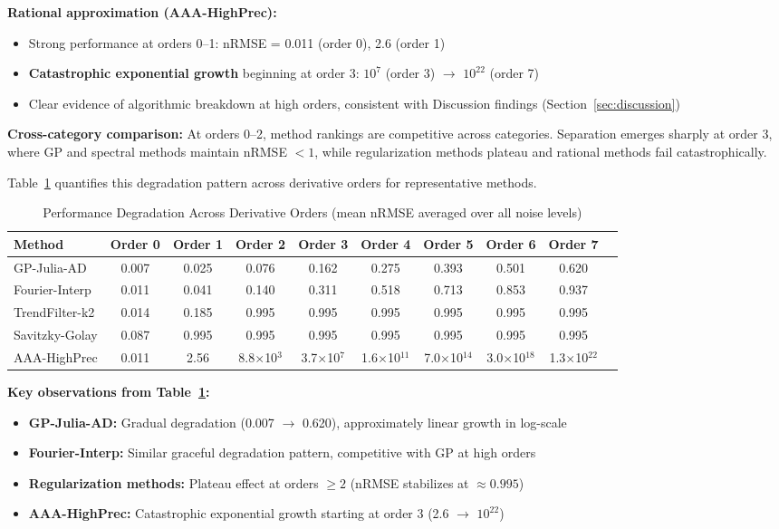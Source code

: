 \textbf{Rational approximation (AAA-HighPrec):}
\begin{itemize}
    \item Strong performance at orders 0--1: nRMSE = 0.011 (order 0), 2.6 (order 1)
    \item \textbf{Catastrophic exponential growth} beginning at order 3: $10^7$ (order 3) $\to$ $10^{22}$ (order 7)
    \item Clear evidence of algorithmic breakdown at high orders, consistent with Discussion findings (Section~\ref{sec:discussion})
\end{itemize}

\textbf{Cross-category comparison:} At orders 0--2, method rankings are competitive across categories. Separation emerges sharply at order 3, where GP and spectral methods maintain nRMSE $< 1$, while regularization methods plateau and rational methods fail catastrophically.

Table~\ref{tab:performance_by_order} quantifies this degradation pattern across derivative orders for representative methods.

\begin{table}[htbp]
\centering
\caption{Performance Degradation Across Derivative Orders (mean nRMSE averaged over all noise levels)}
\label{tab:performance_by_order}
\small
\begin{tabular}{lccccccccc}
\toprule
\textbf{Method} & \textbf{Order 0} & \textbf{Order 1} & \textbf{Order 2} & \textbf{Order 3} & \textbf{Order 4} & \textbf{Order 5} & \textbf{Order 6} & \textbf{Order 7} \\
\midrule
GP-Julia-AD & 0.007 & 0.025 & 0.076 & 0.162 & 0.275 & 0.393 & 0.501 & 0.620 \\
Fourier-Interp & 0.011 & 0.041 & 0.140 & 0.311 & 0.518 & 0.713 & 0.853 & 0.937 \\
TrendFilter-k2 & 0.014 & 0.185 & 0.995 & 0.995 & 0.995 & 0.995 & 0.995 & 0.995 \\
Savitzky-Golay & 0.087 & 0.995 & 0.995 & 0.995 & 0.995 & 0.995 & 0.995 & 0.995 \\
AAA-HighPrec & 0.011 & 2.56 & 8.8$\times$10$^{3}$ & 3.7$\times$10$^{7}$ & 1.6$\times$10$^{11}$ & 7.0$\times$10$^{14}$ & 3.0$\times$10$^{18}$ & 1.3$\times$10$^{22}$ \\
\bottomrule
\end{tabular}
\end{table}

\textbf{Key observations from Table~\ref{tab:performance_by_order}:}
\begin{itemize}
    \item \textbf{GP-Julia-AD:} Gradual degradation (0.007 $\to$ 0.620), approximately linear growth in log-scale
    \item \textbf{Fourier-Interp:} Similar graceful degradation pattern, competitive with GP at high orders
    \item \textbf{Regularization methods:} Plateau effect at orders $\geq 2$ (nRMSE stabilizes at $\approx 0.995$)
    \item \textbf{AAA-HighPrec:} Catastrophic exponential growth starting at order 3 (2.6 $\to$ $10^{22}$)
\end{itemize}

